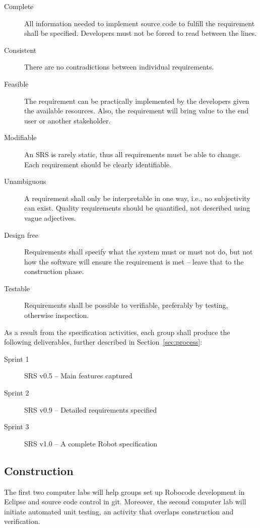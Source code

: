\documentclass{scrreprt}
\begin{document}
\begin{description}
\item[Complete] All information needed to implement source code to fulfill the requirement shall be specified. Developers must not be forced to read between the lines.
\item[Consistent] There are no contradictions between individual requirements.
\item[Feasible] The requirement can be practically implemented by the developers given the available resources. Also, the requirement will bring value to the end user or another stakeholder.
\item[Modifiable] An SRS is rarely static, thus all requirements must be able to change. Each requirement should be clearly identifiable.
\item[Unambiguous] A requirement shall only be interpretable in one way, i.e., no subjectivity can exist. Quality requirements should be quantified, not described using vague adjectives.
\item[Design free] Requirements shall specify what the system must or must not do, but not how the software will ensure the requirement is met -- leave that to the construction phase.
\item[Testable] Requirements shall be possible to verifiable, preferably by testing, otherwise inspection. 
\end{description}

As a result from the specification activities, each group shall produce the following deliverables, further described in Section~\ref{sec:process}:
\begin{description}
\item[Sprint 1] SRS v0.5 -- Main features captured
\item[Sprint 2] SRS v0.9 -- Detailed requirements specified
\item[Sprint 3] SRS v1.0 -- A complete Robot specification
\end{description}

\subsection{Construction}
The first two computer labs will help groups set up Robocode development in Eclipse and source code control in git. Moreover, the second computer lab will initiate automated unit testing, an activity that overlaps construction and verification.
\end{document}
